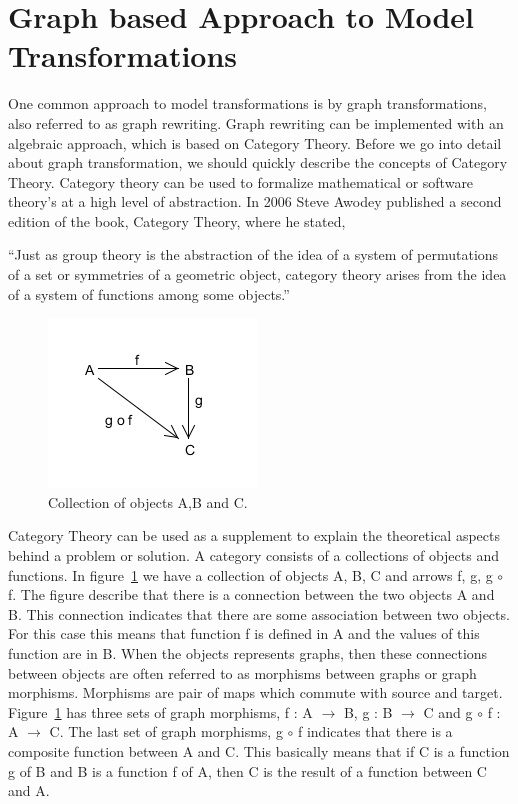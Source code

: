 
\section{Graph based Approach to Model Transformations} 

One common approach to model transformations is by graph transformations,
also referred to as graph rewriting. Graph rewriting can be implemented with
an algebraic approach, which is based on Category Theory. Before we go into
detail about graph transformation, we should quickly describe the concepts of
Category Theory\cite{Herrlich1973,Barr1990}. Category theory can be used to
formalize mathematical or software theory's at a high level of abstraction. In
2006 Steve Awodey published a second edition of the book, Category Theory,
where he stated,

``Just as group theory is the abstraction of the idea of a system of
permutations of a set or symmetries of a geometric object, category theory
arises from the idea of a system of functions among some
objects\cite{Awodey2006}.''

\begin{figure}[H]
	\centering
	\includegraphics[scale=0.7]{./Figures/categoryTheory.png}
	\caption[Category Theory]
	{Collection of objects A,B and C.}
	\label{fig:categoryTheory}
\end{figure}

Category Theory can be used as a supplement to explain the theoretical aspects
behind a problem or solution. A category consists of a collections of
objects and functions. In figure~\ref{fig:categoryTheory} we have a collection
of objects A, B, C and arrows f, g, g $\circ$ f. The figure describe that
there is a connection between the two objects A and B. This connection
indicates that there are some association between two objects. For this case
this means that function f is defined in A and the values of this function are
in B. When the objects represents graphs, then these connections between objects
are often referred to as morphisms between graphs or graph morphisms. Morphisms
are pair of maps which commute with source and target\cite{Brown2008}.
Figure~\ref{fig:categoryTheory} has three sets of graph morphisms, f : A
$\longrightarrow$ B, g : B $\longrightarrow$ C and g $\circ$ f : A
$\longrightarrow$ C. The last set of graph morphisms, g $\circ$ f indicates that
there is a composite function between A and C. This basically means that if
C is a function g of B and B is a function f of A, then C is the result of a
function between C and A. 

